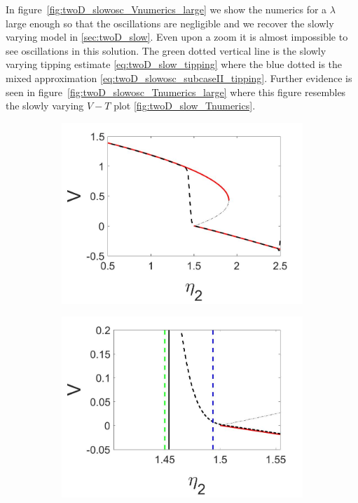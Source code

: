 In figure~\ref{fig:twoD_slowosc_Vnumerics_large} we show the numerics for a $\lambda$ large enough so that the oscillations are negligible and we recover the slowly varying model in \autoref{sec:twoD_slow}. Even upon a zoom it is almost impossible to see oscillations in this solution. The green dotted vertical line is the slowly varying tipping estimate \eqref{eq:twoD_slow_tipping} where the blue dotted is the mixed approximation \eqref{eq:twoD_slowosc_subcaseII_tipping}. Further evidence is seen in figure~\ref{fig:twoD_slowosc_Tnumerics_large} where this figure resembles the slowly varying $V-T$ plot \eqref{fig:twoD_slow_Tnumerics}.

\begin{figure}[H]
\centering
\begin{subfigure}{.5\textwidth}
  \centering
  \includegraphics[width=\linewidth]{twoD/slowosc_bif_diagram_large.jpg}
  \caption{}
\end{subfigure}%
\begin{subfigure}{.5\textwidth}
  \centering
  \includegraphics[width=\linewidth]{twoD/slowosc_bif_diagram_large_zoom.jpg}

\end{subfigure}
\end{figure}
